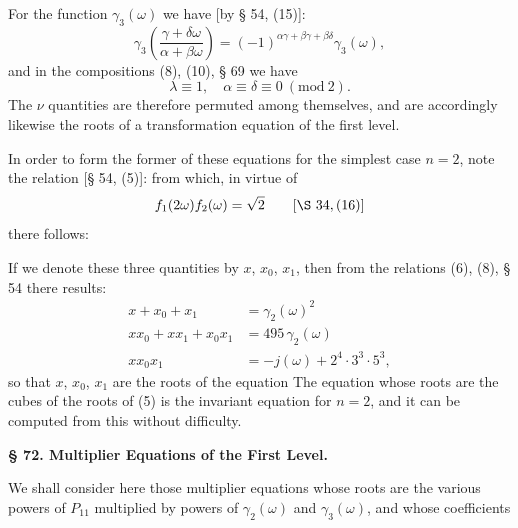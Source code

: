 For the function $\gamma_3(\omega)$ we have [by § 54, (15)]:
\[
\gamma_3\left(\frac{\gamma+\delta\omega}{\alpha+\beta\omega}\right) = (-1)^{\alpha\gamma+\beta\gamma+\beta\delta} \gamma_3(\omega),
\]
and in the compositions (8), (10), § 69 we have
\[
\lambda \equiv 1, \quad \alpha \equiv \delta \equiv 0 \ (\mathrm{mod}\ 2).
\]
The $\nu$ quantities
are therefore permuted among themselves, and are accordingly likewise the
roots of a transformation equation of the first level.

In order to form the former of these equations for the simplest case
$n=2$, note the relation [§ 54, (5)]:
from which, in virtue of
\[
f_1(2\omega) f_2(\omega) = \sqrt{2} \qquad [\S\ 34, (16)]
\]
there follows:

If we denote these three quantities by $x$, $x_0$, $x_1$, then from the
relations (6), (8), § 54 there results:
\[
\begin{aligned}
x + x_0 + x_1 &= \gamma_2(\omega)^2 \\
xx_0 + xx_1 + x_0x_1 &= 495\,\gamma_2(\omega) \\
xx_0x_1 &= -j(\omega) + 2^4\cdot3^3\cdot5^3,
\end{aligned}
\]
so that $x$, $x_0$, $x_1$ are the roots of the equation
The equation whose roots are the cubes of the roots of (5) is the
invariant equation for $n=2$, and it can be computed from this without
difficulty.

\begin{center}
\textbf{§ 72. Multiplier Equations of the First Level.}
\end{center}

We shall consider here those multiplier equations whose roots are the
various powers of $P_{11}$ multiplied by powers of
$\gamma_2(\omega)$ and $\gamma_3(\omega)$, and whose coefficients
